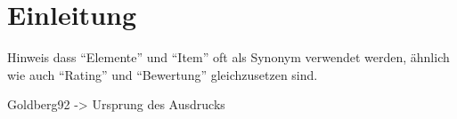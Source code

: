 \section{Einleitung}


Hinweis dass ``Elemente'' und ``Item'' oft als Synonym verwendet werden, ähnlich wie auch ``Rating'' und ``Bewertung'' gleichzusetzen sind.

Goldberg92 -> Ursprung des Ausdrucks